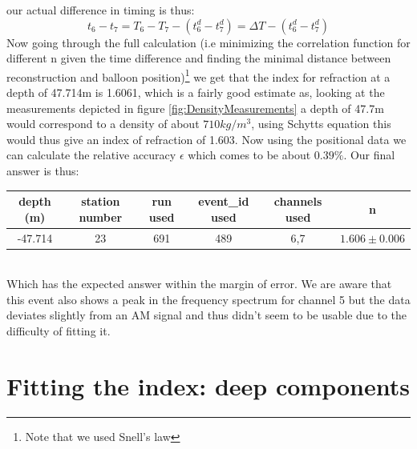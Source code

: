 \documentclass[11pt,a4paper,faculty=we,language=en,doctype=report]{cls/ugent-doc}
\begin{document}
our actual difference
in timing is thus:
\begin{equation}
	t_6 - t_7 = T_6 - T_7 - (t_6^d - t_7^d) = \Delta T - (t_6^d - t_7^d)
\end{equation}
Now going through the full calculation (i.e minimizing the correlation function
for different n given the time difference and finding the minimal distance
between reconstruction and balloon position)\footnote{Note that we used Snell's
law} we get that the index for refraction at a depth of 47.714m is 1.6061,
which is a fairly good estimate as, looking at the measurements depicted in
figure \ref{fig:DensityMeasurements} a depth of 47.7m would correspond to a
density of about $710 kg/m^3$, using Schytts equation this would thus give an
index of refraction of 1.603.  Now using the positional data we can calculate
the relative accuracy $\epsilon$ which comes to be about $0.39\%$. Our final
answer is thus:
\begin{table}[h]
    \centering
    \begin{tabular}{c|c|c|c|c|c}
      depth (m)& station number & run used & event\_id used & channels used & n\\
      \hline
      -47.714 & 23 & 691 & 489 & 6,7 & $1.606 \pm 0.006$
    \end{tabular}
\end{table}\\
Which has the expected answer within the margin of error. We are aware that
this event also shows a peak in the frequency spectrum for channel 5 but the
data deviates slightly from an AM signal and thus didn't seem to be usable due
to the difficulty of fitting it. 
\newpage
\section{Fitting the index: deep components}
\end{document}
